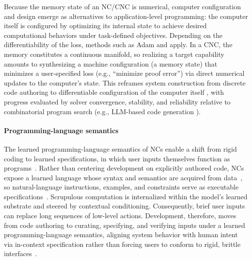 Because the memory state of an NC/CNC is numerical, computer configuration and design emerge as alternatives to application-level programming: the computer itself is configured by optimizing its internal state to achieve desired computational behaviors under task-defined objectives. 
Depending on the differentiability of the loss, methods such as Adam \citep{adam2014method} and \citep{wierstra2014natural} apply. In a CNC, the memory constitutes a continuous manifold, so realizing a target capability amounts to synthesizing a machine configuration (a memory state) that minimizes a user-specified loss (e.g., “minimize proof error”) via direct numerical updates to the computer’s state. This reframes system construction from discrete code authoring to differentiable configuration of the computer itself \citep{innes2019differentiable}, with progress evaluated by solver convergence, stability, and reliability relative to combinatorial program search (e.g., LLM-based code generation \citep{hong2023metagpt}).

\paragraph{Programming-language semantics}
The learned programming-language semantics of NCs enable a shift from rigid coding to learned specifications, in which user inputs themselves function as programs~\citep{brown2020language,wei2022chain}. 
Rather than centering development on explicitly authored code, NCs expose a learned language whose syntax and semantics are acquired from data~\citep{radford2019language,bommasani2021opportunities}, so natural-language instructions, examples, and constraints serve as executable specifications~\citep{ouyang2022training}. 
Scrupulous computation is internalized within the model’s learned substrate and steered by contextual conditioning.
Consequently, brief user inputs can replace long sequences of low-level actions. 
Development, therefore, moves from code authoring to curating, specifying, and verifying inputs under a learned programming-language semantics, aligning system behavior with human intent via in-context specification rather than forcing users to conform to rigid, brittle interfaces~\citep{austin2021program}.

